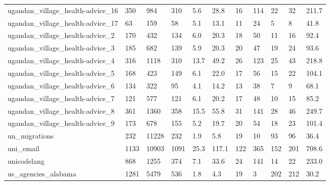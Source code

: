 \begin{longtable}{lllllllllll}
 ugandan\_village\_health-advice\_16                   & 350        & 984       & 310   & 5.6    & 28.8   & 16    & 114    & 22     & 32     & 211.7   \\
 ugandan\_village\_health-advice\_17                   & 63         & 159       & 58    & 5.1    & 13.1   & 11    & 24     & 5      & 8      & 41.8    \\
 ugandan\_village\_health-advice\_2                    & 170        & 432       & 134   & 6.0    & 20.3   & 18    & 50     & 11     & 16     & 92.4    \\
 ugandan\_village\_health-advice\_3                    & 185        & 682       & 139   & 5.9    & 20.3   & 20    & 47     & 19     & 24     & 93.6    \\
 ugandan\_village\_health-advice\_4                    & 316        & 1118      & 310   & 13.7   & 49.2   & 26    & 123    & 25     & 43     & 218.8   \\
 ugandan\_village\_health-advice\_5                    & 168        & 423       & 149   & 6.1    & 22.0   & 17    & 56     & 15     & 22     & 104.1   \\
 ugandan\_village\_health-advice\_6                    & 134        & 322       & 95    & 4.1    & 14.2   & 13    & 38     & 7      & 9      & 68.1    \\
 ugandan\_village\_health-advice\_7                    & 121        & 577       & 121   & 6.1    & 20.2   & 17    & 48     & 10     & 15     & 85.2    \\
 ugandan\_village\_health-advice\_8                    & 361        & 1360      & 358   & 15.5   & 55.8   & 31    & 141    & 28     & 46     & 249.7   \\
 ugandan\_village\_health-advice\_9                    & 173        & 678       & 155   & 5.2    & 19.7   & 20    & 54     & 18     & 23     & 101.4   \\
 un\_migrations                                      & 232        & 11228     & 232   & 1.9    & 5.8    & 19    & 10     & 93     & 96     & 36.4    \\
 uni\_email                                          & 1133       & 10903     & 1091  & 25.3   & 117.1  & 122   & 365    & 152    & 201    & 708.6   \\
 unicodelang                                        & 868        & 1255      & 374   & 7.1    & 33.6   & 24    & 141    & 14     & 22     & 233.0   \\
 us\_agencies\_alabama                                & 1281       & 5479      & 536   & 1.8    & 4.3    & 19    & 3      & 202    & 212    & 30.2    \\

\end{longtable}
